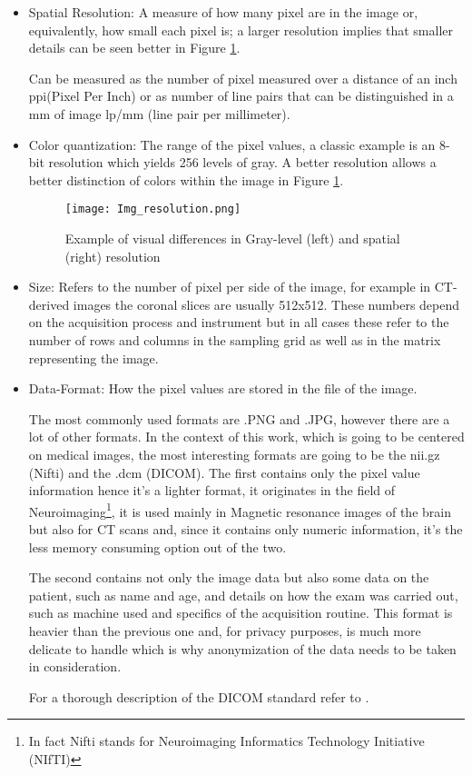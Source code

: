\begin{itemize}
\item Spatial Resolution: A measure of how many pixel are in the image or, equivalently, how small each pixel is; a larger resolution implies that smaller details can be seen better in Figure \ref{fig:resolution_types}.

Can be measured as the number of pixel measured over a distance of an inch ppi(Pixel Per Inch) or as number of line pairs that can be distinguished in a mm of image lp/mm (line pair per millimeter).
\item Color quantization: The range of the pixel values, a classic example is an 8-bit resolution which yields 256 levels of gray. A better resolution allows a better distinction of colors within the image in Figure \ref{fig:resolution_types}.

\begin{figure}[H]
  		\texttt{[image: Img\_resolution.png]}
        \caption{Example of visual differences in Gray-level (left) and spatial (right) resolution \label{fig:resolution_types}}
\end{figure}

\item Size: Refers to the number of pixel per side of the image, for example in CT-derived images the coronal slices are usually 512x512. These numbers depend on the acquisition process and instrument but in all cases these refer to the number of rows and columns in the sampling grid as well as in the matrix representing the image.
\item Data-Format: How the pixel values are stored in the file of the image. 

The most commonly used formats are .PNG and .JPG, however there are a lot of other formats. In the context of this work, which is going to be centered on medical images, the most interesting formats are going to be the nii.gz (Nifti) and the .dcm (DICOM).
The first contains only the pixel value information hence it's a lighter format, it originates in the field of Neuroimaging\footnote{In fact Nifti stands for Neuroimaging Informatics Technology Initiative (NIfTI)}, it is used mainly in Magnetic resonance images of the brain but also for CT scans and, since it contains only  numeric information, it's the less memory consuming option out of the two.

The second contains not only the image data but also some data on the patient, such as name and age, and details on how the exam was carried out, such as machine used and specifics of the acquisition routine. 
This format is heavier than the previous one and, for privacy purposes, is much more delicate to handle which is why anonymization of the data needs to be taken in consideration. 

For a thorough description of the DICOM standard refer to \cite{DICOM}.
\end{itemize}

